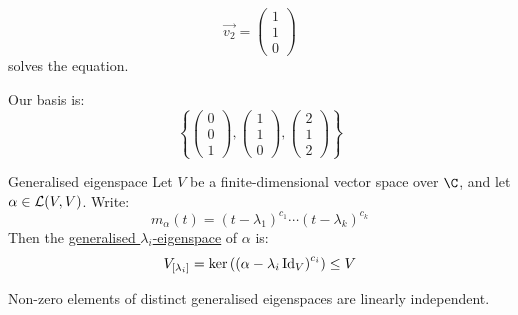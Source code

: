 \documentclass[../Main.tex]{subfiles}
\begin{document}
\begin{example}
    \begin{equation*}
        \vec{v_2} = \begin{pmatrix}1 \\ 1 \\ 0\end{pmatrix}
    \end{equation*}
    solves the equation.

    Our basis is:
    \begin{equation*}
        \left\{\begin{pmatrix}0 \\ 0 \\ 1\end{pmatrix}, \begin{pmatrix}1 \\ 1 \\ 0\end{pmatrix}, \begin{pmatrix}2 \\ 1 \\ 2\end{pmatrix}\right\}
    \end{equation*}
\end{example}
\begin{definition}{Generalised eigenspace}
    Let $V$ be a finite-dimensional vector space over $\C$, and let $\alpha \in \mathcal{L}(V, V)$. Write:
    \begin{equation*}
        m_\alpha(t) = (t - \lambda_1)^{c_1} \cdots (t - \lambda_k)^{c_k}
    \end{equation*}
    Then the \underline{generalised $\lambda_i$-eigenspace} of $\alpha$ is:
    \begin{equation*}
        {V}_{[\lambda_i]} = \ker\left(\left(\alpha - \lambda_i \operatorname{Id}_V\right)^{c_i}\right)\leq V
    \end{equation*}
\end{definition}
\begin{lemma}
    Non-zero elements of distinct generalised eigenspaces are linearly independent.
    \label{lemGELIVectors}
\end{lemma}
\end{document}
